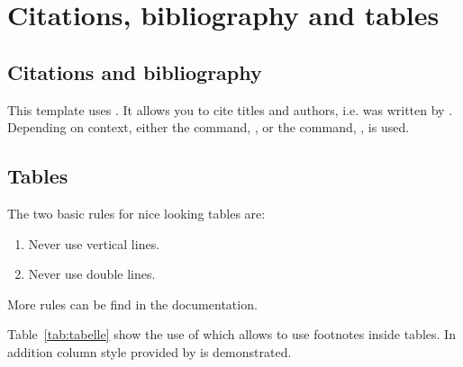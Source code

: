 \cleardoublepage
\chapter{Citations, bibliography and tables}\label{ch:conclusion}

\section{Citations and bibliography}
This template uses . It allows you to cite titles and authors, i.e.  was written by \citeauthor{freierMobileQuantumGravity2016}. Depending on context, either the  command, \textcite{schkolnikEffectWavefrontAberrations2015}, or the  command, \parencite{schkolnikEffectWavefrontAberrations2015}, is used.


\section{Tables}
The two basic rules for nice looking tables are:
\begin{enumerate}
    \item Never use vertical lines.
    \item Never use double lines.
\end{enumerate}
More rules can be find in the  documentation.


Table \,\ref{tab:tabelle} show the use of  which allows to use footnotes inside tables. In addition column style provided by  is demonstrated.

